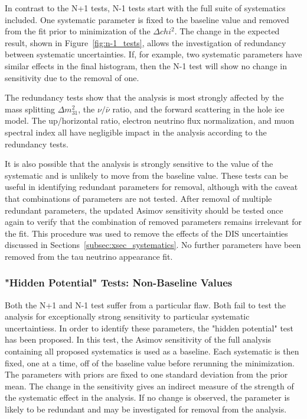 In contrast to the N+1 tests, N-1 tests start with the full suite of systematics included.
One systematic parameter is fixed to the baseline value and removed from the fit prior to minimization of the $\Delta chi^2$.
The change in the expected result, shown in Figure~\ref{fig:n-1_tests}, allows the investigation of redundancy between systematic uncertainties.
If, for example, two systematic parameters have similar effects in the final histogram, then the N-1 test will show no change in sensitivity due to the removal of one.

The redundancy tests show that the analysis is most strongly affected by the mass splitting $\Delta m^2_{31}$, the $\nu/\bar{\nu}$ ratio, and the forward scattering in the hole ice model.
The up/horizontal ratio, electron neutrino flux normalization, and muon spectral index all have negligible impact in the analysis according to the redundancy tests.

It is also possible that the analysis is strongly sensitive to the value of the systematic and is unlikely to move from the baseline value.
These tests can be useful in identifying redundant parameters for removal, although with the caveat that combinations of parameters are not tested.
After removal of multiple redundant parameters, the updated Asimov sensitivity should be tested once again to verify that the combination of removed parameters remains irrelevant for the fit.
This procedure was used to remove the effects of the DIS uncertainties discussed in Sections~\ref{subsec:xsec_systematics}.
No further parameters have been removed from the tau neutrino appearance fit.

\subsubsection{"Hidden Potential" Tests: Non-Baseline Values}
Both the N+1 and N-1 test suffer from a particular flaw.
Both fail to test the analysis for exceptionally strong sensitivity to particular systematic uncertaintiess.
In order to identify these parameters, the "hidden potential" test has been proposed.
In this test, the Asimov sensitivity of the full analysis containing all proposed systematics is used as a baseline.
Each systematic is then fixed, one at a time, off of the baseline value before rerunning the minimization.
The parameters with priors are fixed to one standard deviation from the prior mean.
The change in the sensitivity gives an indirect measure of the strength of the systematic effect in the analysis.
If no change is observed, the parameter is likely to be redundant and may be investigated for removal from the analysis.


